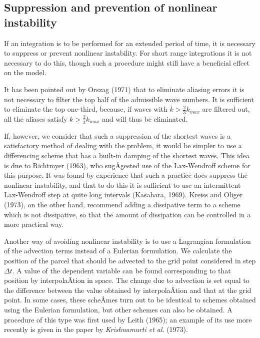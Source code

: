 \subsection{\texorpdfstring{\textbf{Suppression and prevention of
nonlinear
instability}}{Suppression and prevention of nonlinear instability}}\label{suppression-and-prevention-of-nonlinear-instability}

If an integration is to be performed for an extended period of time, it
is necessary to suppress or prevent nonlinear instability. For short
range integrations it is not necessary to do this, though such a
procedure might still have a beneficial effect on the model.

It has been pointed out by Orszag (1971) that to eliminate aliasing
errors it is not necessary to filter the top half of the admissible wave
numbers. It is sufficient to eliminate the top one-third, because, if
waves with \(k > \frac{2}{3}k_{max}\) are filtered out, all the aliases
satisfy \(k > \frac{2}{3}k_{max}\) and will thus be eliminated.

If, however, we consider that such a suppression of the shortest waves
is a satisfactory method of dealing with the problem, it would be
simpler to use a differencing scheme that has a built-in damping of the
shortest waves. This idea is due to Richtmyer (1963), who sugÂ­gested use
of the Lax-Wendroff scheme for this purpose. It was found by experience
that such a practice does suppress the nonlinear instability, and that
to do this it is sufficient to use an intermittent Lax-Wendroff step at
quite long intervals (Kasahara, 1969). Kreiss and Oliger (1973), on the
other hand, recommend adding a dissipative term to a scheme which is not
dissipative, so that the amount of dissipation can be controlled in a
more practical way.

Another way of avoiding nonlinear instability is to use a Lagrangian
formulation of the advection terms instead of a Eulerian formulation. We
calculate the position of the parcel that should be advected to the grid
point considered in step \(\Delta t\). A value of the dependent variable
can be found corresponding to that position by interpolaÂ­tion in space.
The change due to advection is set equal to the difference between the
value obtained by interpolaÂ­tion and that at the grid point. In some
cases, these scheÂ­mes turn out to be identical to schemes obtained using
the Eulerian formulation, but other schemes can also be obtained. A
procedure of this type was first used by Leith (1965); an example of its
use more recently is given in the paper by \emph{Krishnamurti et al}.
(1973).

